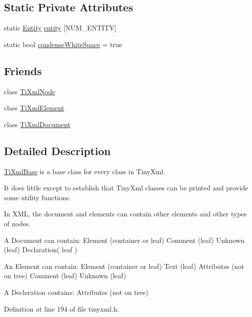\subsection*{Static Private Attributes}
\begin{DoxyCompactItemize}
\item 
static \hyperlink{struct_ti_xml_base_1_1_entity}{Entity} \hyperlink{class_ti_xml_base_aae956c75fedff20d337f7cc109c6b71a}{entity} \mbox{[}NUM\_\-ENTITY\mbox{]}
\item 
static bool \hyperlink{class_ti_xml_base_a447a05f6a3edbb7892f66f9df8244a3d}{condenseWhiteSpace} = true
\end{DoxyCompactItemize}
\subsection*{Friends}
\begin{DoxyCompactItemize}
\item 
class \hyperlink{class_ti_xml_base_a218872a0d985ae30e78c55adc4bdb196}{TiXmlNode}
\item 
class \hyperlink{class_ti_xml_base_ab6592e32cb9132be517cc12a70564c4b}{TiXmlElement}
\item 
class \hyperlink{class_ti_xml_base_a173617f6dfe902cf484ce5552b950475}{TiXmlDocument}
\end{DoxyCompactItemize}


\subsection{Detailed Description}
\hyperlink{class_ti_xml_base}{TiXmlBase} is a base class for every class in TinyXml. 

It does little except to establish that TinyXml classes can be printed and provide some utility functions.

In XML, the document and elements can contain other elements and other types of nodes.

\begin{DoxyVerb}
	A Document can contain:	Element	(container or leaf)
							Comment (leaf)
							Unknown (leaf)
							Declaration( leaf )

	An Element can contain:	Element (container or leaf)
							Text	(leaf)
							Attributes (not on tree)
							Comment (leaf)
							Unknown (leaf)

	A Decleration contains: Attributes (not on tree)
	\end{DoxyVerb}
 

Definition at line 194 of file tinyxml.h.



